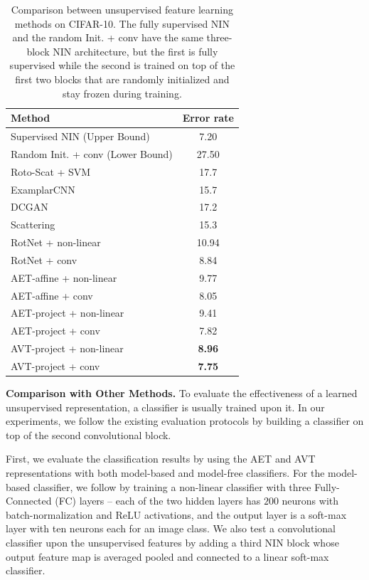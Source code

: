 \documentclass[10pt,journal,compsoc,twoside]{IEEEtran}
\begin{document}
\begin{table}
\caption{Comparison between unsupervised feature learning methods on CIFAR-10. The fully supervised NIN and the random Init. + conv have the same three-block NIN architecture, but the first is fully supervised while the second is trained on top of the first two blocks that are randomly initialized and stay frozen during training.}\label{tab01}
\centering
 \begin{tabular}{l|c} \toprule
Method&Error rate\\ \midrule
Supervised NIN \cite{gidaris2018unsupervised} (Upper Bound)&7.20  \\
Random Init. + conv \cite{gidaris2018unsupervised} (Lower Bound)&27.50  \\ \midrule
Roto-Scat + SVM \cite{oyallon2015deep} &17.7 \\
ExamplarCNN \cite{dosovitskiy2014discriminative} &15.7 \\
DCGAN \cite{radford2015unsupervised}&17.2 \\
Scattering \cite{oyallon2017scaling}&15.3\\
RotNet + non-linear \cite{gidaris2018unsupervised}&10.94\\
RotNet + conv \cite{gidaris2018unsupervised}&8.84\\\midrule
AET-affine + non-linear  &9.77\\
AET-affine + conv  &8.05\\
AET-project + non-linear  &9.41\\
AET-project + conv  &7.82\\ \midrule
AVT-project + non-linear &\textbf{8.96} \\
AVT-project + conv &\textbf{7.75} \\
\bottomrule
\end{tabular}
\end{table}

{\noindent\bf Comparison with Other Methods.} To evaluate the effectiveness of a learned unsupervised representation, a classifier is usually trained upon it. In our experiments, we follow the existing evaluation protocols \cite{oyallon2015deep,dosovitskiy2014discriminative,radford2015unsupervised,oyallon2017scaling,gidaris2018unsupervised} by building a classifier on top of the second convolutional block.

First, we evaluate the classification results by using the AET and AVT representations with both model-based and model-free classifiers.  For the model-based classifier, we follow \cite{gidaris2018unsupervised} by training a non-linear classifier with three Fully-Connected (FC) layers -- each of the two hidden layers has $200$ neurons with batch-normalization and ReLU activations, and the output layer is a soft-max layer with ten neurons each for an image class. We also test a convolutional classifier upon the unsupervised features by adding a third NIN block whose output feature map is averaged pooled and connected to a linear soft-max classifier.
\end{document}
